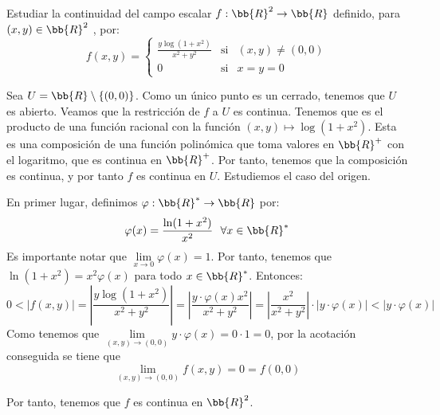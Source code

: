 \begin{ejercicio}
    Estudiar la continuidad del campo escalar $f : \bb{R}^2 \to \bb{R}$ definido, para $(x, y) \in \bb{R}^2$ , por:
    \begin{equation*}
        f(x,y)=
        \left\{\begin{array}{ccc}
            \displaystyle \frac{y\log(1+x^2)}{x^2+y^2} &\text{si}& (x,y)\neq (0,0)\\
            0 &\text{si}& x=y=0
        \end{array}\right.
    \end{equation*}

    Sea $U=\bb{R}\setminus \{(0,0)\}$. Como un único punto es un cerrado, tenemos que $U$ es abierto. 
    Veamos que la restricción de $f$ a $U$ es continua. Tenemos que es el producto de una función racional con la función $(x,y)\mapsto \log(1+x^2)$. Esta es una composición de una función polinómica que toma valores en $\bb{R}^+$ con el logaritmo, que es continua en $\bb{R}^+$. Por tanto, tenemos que la composición es continua, y por tanto $f$ es continua en $U$. Estudiemos el caso del origen.

    En primer lugar, definimos $\varphi:\bb{R}^\ast \to \bb{R}$ por:
    \begin{equation*}
        \varphi(x)=\frac{\ln(1+x^2)}{x^2}~~\forall x\in \bb{R}^\ast
    \end{equation*}    
    Es importante notar que $\lim\limits_{x\to 0}\varphi(x)=1$. Por tanto, tenemos que $\ln(1+x^2)=x^2\varphi(x)$ para todo $x\in \bb{R}^\ast$. Entonces:
    \begin{equation*}
        0 < |f(x,y)|
        = \left|\frac{y\log(1+x^2)}{x^2+y^2}\right|
        = \left|\frac{y\cdot \varphi(x)x^2}{x^2+y^2}\right|
        = \left|\frac{x^2}{x^2+y^2}\right|\cdot |y\cdot \varphi(x)| < |y\cdot \varphi(x)|
    \end{equation*}
    Como tenemos que $\lim\limits_{(x,y)\to (0,0)}y\cdot \varphi(x)=0\cdot 1=0$, por la acotación conseguida se tiene que
    $$\lim\limits_{(x,y)\to (0,0)}f(x,y)=0=f(0,0)$$

    Por tanto, tenemos que $f$ es continua en $\bb{R}^2$.
    
\end{ejercicio}

